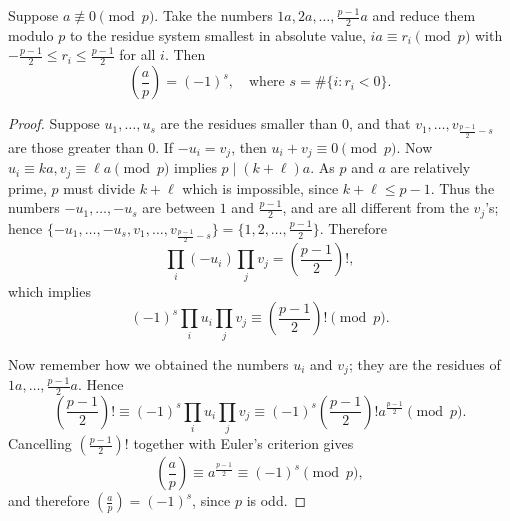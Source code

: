 \begin{theorem}
  \label{gauss_lemma}
  Suppose $a \not\equiv 0 \pmod{p}$. Take the numbers $1a, 2a, \dots, \frac{p-1}{2}a$ and reduce them modulo $p$ to the residue system smallest in absolute value, $ia \equiv r_i \pmod{p}$ with $-\frac{p-1}{2} \le r_i \le \frac{p-1}{2}$ for all $i$. Then
  \[
  (\frac{a}{p}) = (-1)^s, \quad \text{where } s = \#\{i : r_i < 0\}.
  \]
\end{theorem}
\begin{proof}
  Suppose $u_1, \dots, u_s$ are the residues smaller than $0$, and that $v_1, \dots, v_{\frac{p-1}{2} - s}$ are those greater than $0$. If $-u_i = v_j$, then $u_i + v_j \equiv 0 \pmod{p}$. Now $u_i \equiv ka, v_j \equiv \ell a \pmod{p}$ implies $p \mid (k + \ell) a$. As $p$ and $a$ are relatively prime, $p$ must divide $k + \ell$ which is impossible, since $k + \ell \le p-1$. Thus the numbers $-u_1, \dots, -u_s$ are between $1$ and $\frac{p-1}{2}$, and are all different from the $v_j$'s; hence $\{-u_1, \dots, -u_s, v_1, \dots, v_{\frac{p-1}{2} - s}\} = \{1, 2, \dots, \frac{p-1}{2}\}$. Therefore
  \[
  \prod_{i} (-u_i) \prod_{j} v_j = \left(\frac{p-1}{2}\right)!,
  \]
  which implies
  \[
  (-1)^s \prod_{i} u_i \prod_{j} v_j \equiv \left(\frac{p-1}{2}\right)! \pmod{p}.
  \]
  
  Now remember how we obtained the numbers $u_i$ and $v_j$; they are the residues of $1a, \dots, \frac{p-1}{2}a$. Hence
  \[
  \left(\frac{p-1}{2}\right)! \equiv (-1)^s \prod_{i} u_i \prod_{j} v_j \equiv (-1)^s \left(\frac{p-1}{2}\right)! a^{\frac{p-1}{2}} \pmod{p}.
  \]
  Cancelling $\left(\frac{p-1}{2}\right)!$ together with Euler's criterion gives
  \[
  (\frac{a}{p}) \equiv a^{\frac{p-1}{2}} \equiv (-1)^s \pmod{p},
  \]
  and therefore $(\frac{a}{p}) = (-1)^s$, since $p$ is odd.
\end{proof}

